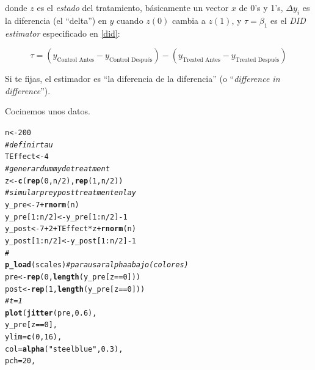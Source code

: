 \documentclass[onesided]{article}\usepackage[]{graphicx}\usepackage[]{color}
\makeatletter
\newcommand{\hlnum}[1]{\textcolor[rgb]{0.686,0.059,0.569}{#1}}%
\newcommand{\hlstr}[1]{\textcolor[rgb]{0.192,0.494,0.8}{#1}}%
\newcommand{\hlcom}[1]{\textcolor[rgb]{0.678,0.584,0.686}{\textit{#1}}}%
\newcommand{\hlopt}[1]{\textcolor[rgb]{0,0,0}{#1}}%
\newcommand{\hlstd}[1]{\textcolor[rgb]{0.345,0.345,0.345}{#1}}%
\newcommand{\hlkwb}[1]{\textcolor[rgb]{0.69,0.353,0.396}{#1}}%
\newcommand{\hlkwc}[1]{\textcolor[rgb]{0.333,0.667,0.333}{#1}}%
\newcommand{\hlkwd}[1]{\textcolor[rgb]{0.737,0.353,0.396}{\textbf{#1}}}%
\newenvironment{kframe}{%
 \def\at@end@of@kframe{}%
 \ifinner\ifhmode%
  \def\at@end@of@kframe{\end{minipage}}%
  \begin{minipage}{\columnwidth}%
 \fi\fi%
 \def\FrameCommand##1{\hskip\@totalleftmargin \hskip-\fboxsep
 \colorbox{shadecolor}{##1}\hskip-\fboxsep
     \hskip-\linewidth \hskip-\@totalleftmargin \hskip\columnwidth}%
 \MakeFramed {\advance\hsize-\width
   \@totalleftmargin\z@ \linewidth\hsize
   \@setminipage}}%
 {\par\unskip\endMakeFramed%
 \at@end@of@kframe}
\newenvironment{knitrout}{}{} %
\makeatother
\begin{document}
donde $z$ es el \emph{estado} del tratamiento, b\'asicamente un vector $x$ de 0's y 1's, $\Delta y_{i}$ es la diferencia (el ``delta'') en $y$ cuando $z(0)$ cambia a $z(1)$, y $\tau=\beta_{1}$ es el \emph{DID estimator} especificado en \autoref{did}:


\begin{equation}\label{did}
\tau = (y_{\text{Control Antes}}-y_{\text{Control Despu\'es}}) - (y_{\text{Treated Antes}}-y_{\text{Treated Despu\'es}})
\end{equation}

Si te fijas, el estimador es ``la diferencia de la diferencia'' (o ``\emph{difference in difference}'').


Cocinemos unos datos.

\begin{knitrout}
\color{fgcolor}\begin{kframe}
\begin{alltt}
\hlstd{n} \hlkwb{<-} \hlnum{200}
\hlcom{# definir tau}
\hlstd{TEffect} \hlkwb{<-} \hlnum{4}
\hlcom{# generar dummy de treatment }
\hlstd{z} \hlkwb{<-} \hlkwd{c}\hlstd{(}\hlkwd{rep}\hlstd{(}\hlnum{0}\hlstd{, n}\hlopt{/}\hlnum{2}\hlstd{),} \hlkwd{rep}\hlstd{(}\hlnum{1}\hlstd{, n}\hlopt{/}\hlnum{2}\hlstd{))}
\hlcom{# simular pre y post treatment en la y}
\hlstd{y_pre} \hlkwb{<-} \hlnum{7} \hlopt{+} \hlkwd{rnorm}\hlstd{(n)}
\hlstd{y_pre[}\hlnum{1}\hlopt{:}\hlstd{n}\hlopt{/}\hlnum{2}\hlstd{]} \hlkwb{<-} \hlstd{y_pre[}\hlnum{1}\hlopt{:}\hlstd{n}\hlopt{/}\hlnum{2}\hlstd{]} \hlopt{-} \hlnum{1}
\hlstd{y_post} \hlkwb{<-} \hlnum{7} \hlopt{+} \hlnum{2} \hlopt{+} \hlstd{TEffect} \hlopt{*} \hlstd{z} \hlopt{+} \hlkwd{rnorm}\hlstd{(n)}
\hlstd{y_post[}\hlnum{1}\hlopt{:}\hlstd{n}\hlopt{/}\hlnum{2}\hlstd{]} \hlkwb{<-} \hlstd{y_post[}\hlnum{1}\hlopt{:}\hlstd{n}\hlopt{/}\hlnum{2}\hlstd{]} \hlopt{-} \hlnum{1}
\hlcom{#}
\hlkwd{p_load}\hlstd{(scales)} \hlcom{# para usar alpha abajo (colores)}
\hlstd{pre} \hlkwb{<-} \hlkwd{rep}\hlstd{(}\hlnum{0}\hlstd{,} \hlkwd{length}\hlstd{(y_pre[z}\hlopt{==}\hlnum{0}\hlstd{]))}
\hlstd{post} \hlkwb{<-} \hlkwd{rep}\hlstd{(}\hlnum{1}\hlstd{,} \hlkwd{length}\hlstd{(y_pre[z}\hlopt{==}\hlnum{0}\hlstd{]))}
\hlcom{# t=1}
\hlkwd{plot}\hlstd{(}\hlkwd{jitter}\hlstd{(pre,} \hlnum{0.6}\hlstd{),}
     \hlstd{y_pre[z} \hlopt{==} \hlnum{0}\hlstd{],}
     \hlkwc{ylim} \hlstd{=} \hlkwd{c}\hlstd{(}\hlnum{0}\hlstd{,} \hlnum{16}\hlstd{),}
     \hlkwc{col} \hlstd{=} \hlkwd{alpha}\hlstd{(}\hlstr{"steelblue"}\hlstd{,} \hlnum{0.3}\hlstd{),}
     \hlkwc{pch} \hlstd{=} \hlnum{20}\hlstd{,}

\end{alltt}
\end{kframe}
\end{knitrout}
\end{document}
